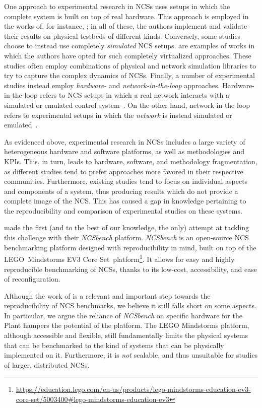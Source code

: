 One approach to experimental research in \acp{NCS} uses setups in which the complete system is built on top of real hardware.
This approach is employed in the works of, for instance, \textcite{Li2014Wireless,Baumann2018LowPower,Cuenca2019UAV}; in all of these, the authors implement and validate their results on physical testbeds of different kinds.
Conversely, some studies choose to instead use completely \emph{simulated} \ac{NCS} setups.
\textcite{Wu2012NPC,Chen2015synccontrol,Ma2019DynamicSched} are examples of works in which the authors have opted for such completely virtualized approaches.
These studies often employ combinations of physical and network simulation libraries to try to capture the complex dynamics of \acp{NCS}.
Finally, a number of experimental studies instead employ \emph{hardware-} and \emph{network-in-the-loop} approaches.
Hardware-in-the-loop refers to \ac{NCS} setups in which a real network interacts with a simulated or emulated control system~\cite{Wang2020VoltageControl}.
On the other hand, network-in-the-loop refers to experimental setups in which the \emph{network} is instead simulated or emulated~\cite{Natale2004InvPendEthernet}.

As evidenced above, experimental research in \acp{NCS} includes a large variety of heterogeneous hardware and software platforms, as well as methodologies and \acp{KPI}.
This, in turn, leads to hardware, software, and methodology fragmentation, as different studies tend to prefer approaches more favored in their respective communities.
Furthermore, existing studies tend to focus on individual aspects and components of a system, thus producing results which do not provide a complete image of the \ac{NCS}.
This has caused a gap in knowledge pertaining to the reproducibility and comparison of experimental studies on these systems.

\textcite{Zoppi2020NCSBench} made the first (and to the best of our knowledge, the only) attempt at tackling this challenge with their \emph{NCSbench} platform.
\emph{NCSbench} is an open-source \ac{NCS} benchmarking platform designed with reproducibility in mind, built on top of the LEGO\textregistered{}\ Mindstorms EV3 Core Set\texttrademark{}\ platform\footnote{\url{https://education.lego.com/en-us/products/lego-mindstorms-education-ev3-core-set/5003400\#lego-mindstorms-education-ev3}}.
It allows for easy and highly reproducible benchmarking of \acp{NCS}, thanks to its low-cost, accessibility, and ease of reconfiguration.

Although the work of \textcite{Zoppi2020NCSBench} is a relevant and important step towards the reproducibility of \ac{NCS} benchmarks, we believe it still falls short on some aspects.
In particular, we argue the reliance of \emph{NCSbench} on specific hardware for the Plant hampers the potential of the platform.
The LEGO Mindstorms platform, although accessible and flexible, still fundamentally limits the physical systems that can be benchmarked to the kind of systems that can be physically implemented on it.
Furthermore, it is \emph{not} scalable, and thus unsuitable for studies of larger, distributed \acp{NCS}.

